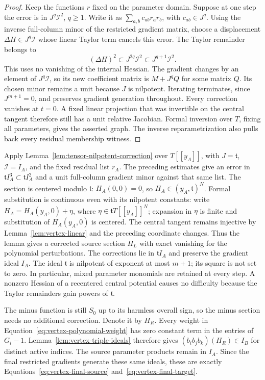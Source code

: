 \begin{proof}
Keep the functions \(r\) fixed on the parameter domain.
Suppose at one step the error is in \(J^q\mathcal I^2\), \(q\geq1\).
Write it as \(\sum_{a,b}c_{ab}r_a r_b\), with \(c_{ab}\in J^q\).
Using the inverse full-column minor of the restricted gradient matrix,
choose a displacement \(\Delta H\in J^q\mathcal I\) whose linear Taylor
term cancels this error.
The Taylor remainder belongs to
\[
       (\Delta H)^2\subset J^{2q}\mathcal I^2
                         \subset J^{q+1}\mathcal I^2 .
\]
This uses no vanishing of the internal Hessian.
The gradient changes by an element of \(J^q\mathcal I\), so its new
coefficient matrix is \(M+J^qQ\) for some matrix \(Q\).
Its chosen minor remains a unit because \(J\) is nilpotent.
Iterating terminates, since \(J^{m+1}=0\), and preserves gradient
generation throughout.
Every correction vanishes at \(t=0\).
A fixed linear projection that was invertible on the central tangent
therefore still has a unit relative Jacobian.  Formal inversion over
\(T\), fixing all parameters, gives the asserted graph.
The inverse reparametrization also pulls back every residual membership
witness.
\end{proof}

Apply Lemma~\ref{lem:tensor-nilpotent-correction} over $T[[y_A]]$, with
$J=\mathfrak t$, $\mathcal I=I_A$, and the fixed residual list $r_A$.
The preceding estimates give an error in
$\mathfrak t I_A^3\subset\mathfrak t I_A^2$ and a unit full-column
gradient minor against that same list.  The section is centered modulo
$\mathfrak t$: $H_A(0,0)=0$, so $H_A\in(y_A,\mathfrak t)^N$.
Formal substitution is continuous even with its nilpotent constants:
write $H_A=H_A(y_A,0)+\eta$, where $\eta\in\mathfrak t T[[y_A]]^N$;
expansion in $\eta$ is finite and substitution of $H_A(y_A,0)$ is
centered.  The central tangent remains injective by
Lemma~\ref{lem:vertex-linear} and the preceding coordinate changes.
Thus the lemma gives a corrected source section $H_L$ with exact
vanishing for the polynomial perturbations.  The corrections lie in
$\mathfrak t I_A$ and preserve the gradient ideal $I_A$.  The ideal
$\mathfrak t$ is nilpotent of exponent at most $m+1$; its square is not
set to zero.  In particular, mixed parameter monomials are retained at
every step.  A nonzero Hessian of a recentered central potential causes
no difficulty because the Taylor remainders gain powers of
$\mathfrak t$.

The minus function is still $S_0$ up to its harmless overall sign, so
the minus section needs no additional correction.  Denote it by $H_R$.
Every weight in Equation~\eqref{eq:vertex-polynomial-weight} has zero constant term
in the entries of $G_i-1$.  Lemma~\ref{lem:vertex-triple-ideals} therefore
gives $(b_ib_jb_k)(H_R)\in I_B$ for distinct active indices.  The source
parameter products remain in $I_A$.  Since the final restricted
gradients generate these same ideals, these are exactly
Equations~\eqref{eq:vertex-final-source} and~\eqref{eq:vertex-final-target}.


